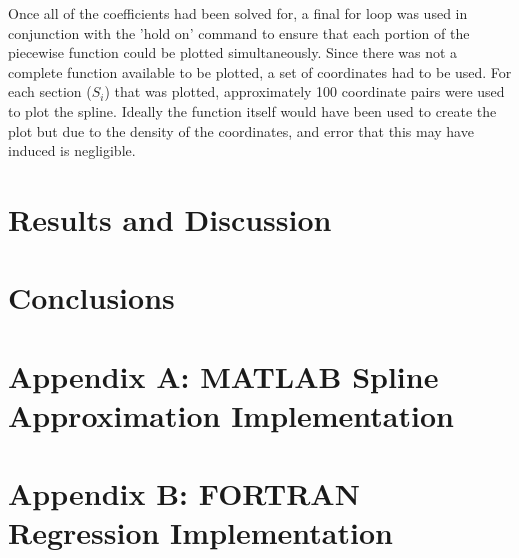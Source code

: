 \documentclass[12pt, letterpaper]{article} %
\begin{document}
Once all of the coefficients had been solved for, a final for loop was used in conjunction with the 'hold on' command to ensure that each portion of the piecewise function could be plotted simultaneously. Since there was not a complete function available to be plotted, a set of coordinates had to be used. For each section ($S_i$) that was plotted, approximately 100 coordinate pairs were used to plot the spline. Ideally the function itself would have been used to create the plot but due to the density of the coordinates, and error that this may have induced is negligible. 

\section{Results and Discussion}

\section{Conclusions}

\section{Appendix A: MATLAB Spline Approximation Implementation}

\section{Appendix B: FORTRAN Regression Implementation}
\end{document}
